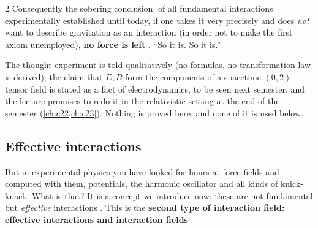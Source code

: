 \begin{paracol}{2}
Consequently the sobering conclusion: of all fundamental interactions experimentally established until today, if one takes it very precisely and does \emph{not} want to describe gravitation as an interaction (in order not to make the first axiom unemployed), \textbf{no force is left} . ``So it is. So it is.''

\begin{coursenote}
The thought experiment is told qualitatively (no formulas, no transformation law is derived); the claim that $E,B$ form the components of a spacetime $(0,2)$ tensor field is stated as a fact of electrodynamics, to be seen next semester, and the lecture promises to redo it in the relativistic
setting at the end of the semester (\cref{ch:c22,ch:c23}). Nothing is proved here, and none of it is used below.
\end{coursenote}

\subsection{Effective interactions}\label{ssec:nd-effective}

But in experimental physics you have looked for hours at force fields and computed with them, potentials, the harmonic oscillator and all kinds of knick-knack. What is that? It is a concept we introduce now: these are not fundamental but \emph{effective} interactions .
This is the \textbf{second type of interaction field: effective interactions and interaction fields} .


\end{paracol}
